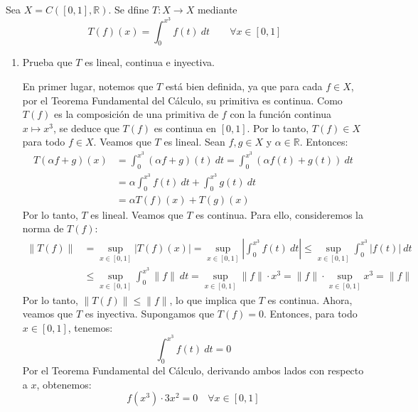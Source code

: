 \documentclass[12pt]{article}
\begin{document}
    \begin{ejercicio}[4 puntos]
        Sea $X=C([0,1],\mathbb{R})$. Se dfine $T:X\to X$ mediante
        \begin{equation*}
            T(f)(x) = \int_{0}^{x^3} f(t)~dt  \qquad \forall x\in [0,1]
        \end{equation*}
        \begin{enumerate}[label=\alph*)]
            \item Prueba que $T$ es lineal, continua e inyectiva.
            
            En primer lugar, notemos que $T$ está bien definida, ya que para cada $f \in X$, por el Teorema Fundamental del Cálculo, su primitiva es continua. Como $T(f)$ es la composición de una primitiva de $f$ con la función continua $x \mapsto x^3$, se deduce que $T(f)$ es continua en $[0,1]$. Por lo tanto, $T(f) \in X$ para todo $f \in X$. Veamos que $T$ es lineal. Sean $f,g \in X$ y $\alpha \in \mathbb{R}$. Entonces:
            \begin{align*}
                T(\alpha f + g)(x) &= \int_{0}^{x^3} (\alpha f + g)(t)~dt 
                = \int_{0}^{x^3} (\alpha f(t) + g(t))~dt \\
                                    &= \alpha \int_{0}^{x^3} f(t)~dt + \int_{0}^{x^3} g(t)~dt \\
                                    &= \alpha T(f)(x) + T(g)(x)
            \end{align*}
            Por lo tanto, $T$ es lineal. Veamos que $T$ es continua. Para ello, consideremos la norma de $T(f)$:
            \begin{align*}
                \|T(f)\| &= \sup_{x\in [0,1]} |T(f)(x)| 
                = \sup_{x\in [0,1]} \left|\int_{0}^{x^3} f(t)~dt\right| 
                \leq \sup_{x\in [0,1]} \int_{0}^{x^3} |f(t)|~dt \\
                          &\leq \sup_{x\in [0,1]} \int_{0}^{x^3} \|f\|~dt 
                          = \sup_{x\in [0,1]} \|f\| \cdot x^3 
                          = \|f\| \cdot \sup_{x\in [0,1]} x^3 
                          = \|f\|
            \end{align*}
            Por lo tanto, $\|T(f)\| \leq \|f\|$, lo que implica que $T$ es continua. Ahora, veamos que $T$ es inyectiva. Supongamos que $T(f) = 0$. Entonces, para todo $x \in [0,1]$, tenemos:
            \begin{equation*}
                \int_{0}^{x^3} f(t)~dt = 0
            \end{equation*}
            Por el Teorema Fundamental del Cálculo, derivando ambos lados con respecto a $x$, obtenemos:
            \begin{equation*}
                f(x^3) \cdot 3x^2 = 0 \quad \forall x \in [0,1]
            \end{equation*}


\end{enumerate}
\end{ejercicio}
\end{document}
